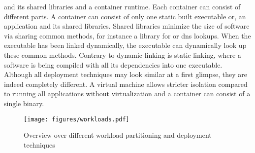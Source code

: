 \documentclass[titlepage]{report}
\begin{document}
and its shared libraries and a container runtime. Each container can consist of different parts. A container can consist of only one static built executable or, an application and its shared libraries.
Shared libraries minimize the size of software via sharing common methods, for instance a library for  or \gls{dns} lookups. When the executable has been linked dynamically,
the executable can dynamically look up these common methods.
Contrary to dynamic linking is static linking, where a software is being compiled with all its dependencies into one executable. Although all deployment techniques may look similar at a first glimpse,
they are indeed completely different. A virtual machine allows stricter isolation compared to running all applications without virtualization and a container can consist of a single binary.
\begin{figure}
    \centering
    \texttt{[image: figures/workloads.pdf]}
    \caption{Overview over different workload partitioning and deployment techniques}\label{fig:workloads}
\end{figure}
\end{document}
